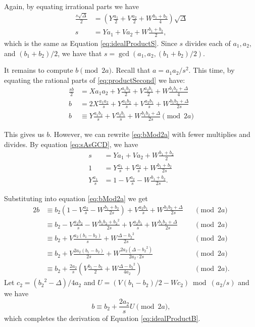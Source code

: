 \documentclass{ucalgthes1}
\theoremstyle{definition}
\begin{document}
\noindent
Again, by equating irrational parts we have
\begin{align}
	\frac{s\sqrt\Delta}{2} & = \left(Y\frac{a_1}{2} + V\frac{a_2}{2} + W\frac{b_1+b_2}{4}\right)\sqrt\Delta \nonumber \\
	s & = Ya_1 + Va_2 + W\frac{b_1+b_2}{2}, \label{eq:sAsGCD}
\end{align}
which is the same as Equation \ref{eq:idealProductS}.  Since $s$ divides each of $a_1, a_2,$ and $(b_1+b_2)/2$, we have that $s = \gcd(a_1, a_2, (b_1+b_2)/2)$.

It remains to compute $b \pmod{2a}$.  Recall that $a = a_1a_2/s^2$.  This time, by equating the rational parts of \eqref{eq:productSecond} we have:
\begin{align}
	\frac{sb}{2} & = Xa_1a_2 + Y\frac{a_1b_2}{2} + V\frac{a_2b_1}{2} + W\frac{b_1b_2 + \Delta}{4} \nonumber \\
	b & = 2X\frac{a_1a_2}{s} + Y\frac{a_1b_2}{s} + V\frac{a_2b_1}{s} + W\frac{b_1b_2 + \Delta}{2s} \nonumber \\
	b & \equiv Y\frac{a_1b_2}{s} + V\frac{a_2b_1}{s} + W\frac{b_1b_2 + \Delta}{2s} \pmod{2a} \label{eq:bMod2a}
\end{align}

\noindent
This gives us $b$.  However, we can rewrite \eqref{eq:bMod2a} with fewer multiplies and divides.  By equation \eqref{eq:sAsGCD}, we have
\begin{align*}
	s & = Ya_1 + Va_2 + W\frac{b_1+b_2}{2} \\
	1 & = Y\frac{a_1}{s} + V\frac{a_2}{s} + W\frac{b_1+b_2}{2s} \\
	Y\frac{a_1}{s} & = 1 - V\frac{a_2}{s} - W\frac{b_1+b_2}{2s}.
\end{align*}

\noindent
Substituting into equation \eqref{eq:bMod2a} we get
\begin{alignat*}{2}
	b & \equiv b_2(1-V\frac{a_2}{s} - W\frac{b_1+b_2}{2s}) + V\frac{a_2b_1}{s} + W\frac{b_1b_2 + \Delta}{2s} && \pmod{2a} \\
	& \equiv b_2 - V\frac{a_2b_2}{s} - W\frac{b_1b_2+{b_2}^2}{2s} + V\frac{a_2b_1}{s} + W\frac{b_1b_2 + \Delta}{2s} && \pmod{2a} \\
	& \equiv b_2 + V\frac{a_2(b_1-b_2)}{s} + W\frac{\Delta - {b_2}^2}{2s} && \pmod{2a} \\
	& \equiv b_2 + V\frac{2a_2(b_1-b_2)}{2s} + W\frac{2a_2(\Delta - {b_2}^2)}{2a_2 \cdot 2s} && \pmod{2a} \\
	& \equiv b_2 + \frac{2a_2}{s} \left( V\frac{b_1-b_2}{2} + W\frac{\Delta - {b_2}^2}{4a_2} \right) && \pmod{2a}.
\end{alignat*}
Let $c_2 = ({b_2}^2 - \Delta)/4a_2$ and $U = (V(b_1-b_2)/2 - Wc_2) \bmod{(a_2/s)}$ and we have
\[
	b \equiv b_2 + \frac{2a_2}{s} U \pmod{2a},
\]
which completes the derivation of Equation \ref{eq:idealProductB}.
\end{document}
